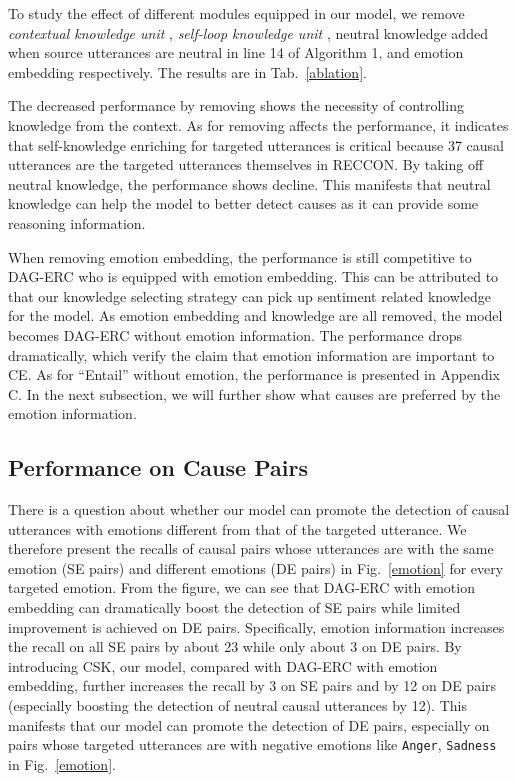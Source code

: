 \documentclass{article}
\begin{document}
To study the effect of different modules equipped in our model, we remove \textit{contextual knowledge unit} , \textit{self-loop knowledge unit} , neutral knowledge added when source utterances are neutral in line 14 of Algorithm 1, and emotion embedding respectively. The results are in Tab.~\ref{ablation}. 

The decreased performance by removing  shows the necessity of controlling knowledge from the context. As for removing  affects the performance, it indicates that self-knowledge enriching for targeted utterances is critical because 37 causal utterances are the targeted utterances themselves in RECCON. By taking off neutral knowledge, the performance shows decline. This manifests that neutral knowledge can help the model to better detect causes as it can provide some reasoning information. 

When removing emotion embedding, the performance is still competitive to DAG-ERC who is equipped with emotion embedding. This can be attributed to that our knowledge selecting strategy can pick up sentiment related knowledge for the model. As emotion embedding and knowledge are all removed, the model becomes DAG-ERC without emotion information. The performance drops dramatically, which verify the claim that emotion information are important to CE. As for ``Entail'' without emotion, the performance is presented in Appendix C. In the next subsection, we will further show what causes are preferred by the emotion information. 




\subsection{Performance on Cause Pairs}

There is a question about whether our model can promote the detection of causal utterances with emotions different from that of the targeted utterance. We therefore present the recalls of causal pairs whose utterances are with the same emotion (SE pairs) and different emotions (DE pairs) in Fig.~\ref{emotion} for every targeted emotion. From the figure, we can see that DAG-ERC with emotion embedding can dramatically boost the detection of SE pairs while limited improvement is achieved on DE pairs. Specifically, emotion information increases the recall on all SE pairs by about 23 while only about 3 on DE pairs. By introducing CSK, our model, compared with DAG-ERC with emotion embedding, further increases the recall by 3 on SE pairs and by 12 on DE pairs (especially boosting the detection of neutral causal utterances by 12). This manifests that our model can promote the detection of DE pairs, especially on pairs whose targeted utterances are with negative emotions like \texttt{Anger}, \texttt{Sadness} in Fig.~\ref{emotion}. 
\end{document}
